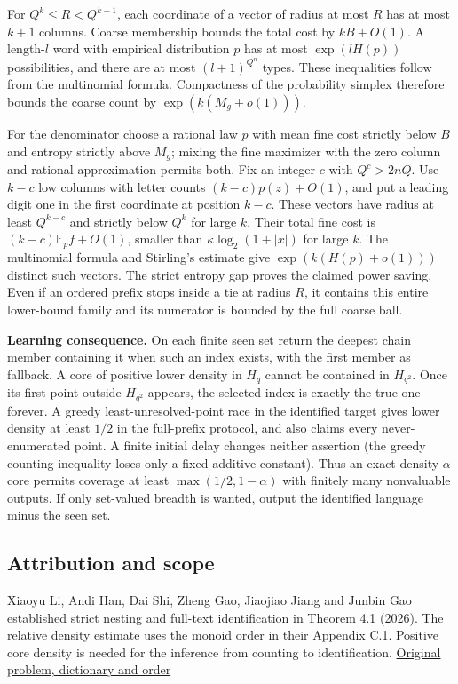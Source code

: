 \documentclass[11pt]{article}
\begin{document}
For \(Q^k\leq R<Q^{k+1}\), each coordinate of a vector of radius at most \(R\) has at most \(k+1\) columns. Coarse membership bounds the total cost by \(kB+O(1)\). A length-\(l\) word with empirical distribution \(p\) has at most \(\exp(lH(p))\) possibilities, and there are at most \((l+1)^{Q^n}\) types. These inequalities follow from the multinomial formula. Compactness of the probability simplex therefore bounds the coarse count by \(\exp(k(M_g+o(1)))\).

For the denominator choose a rational law \(p\) with mean fine cost strictly below \(B\) and entropy strictly above \(M_g\); mixing the fine maximizer with the zero column and rational approximation permits both. Fix an integer \(c\) with \(Q^c>2nQ\). Use \(k-c\) low columns with letter counts \((k-c)p(z)+O(1)\), and put a leading digit one in the first coordinate at position \(k-c\). These vectors have radius at least \(Q^{k-c}\) and strictly below \(Q^k\) for large \(k\). Their total fine cost is \((k-c)\mathbb E_p f+O(1)\), smaller than \(\kappa\log_2(1+|x|)\) for large \(k\). The multinomial formula and Stirling's estimate give \(\exp(k(H(p)+o(1)))\) distinct such vectors. The strict entropy gap proves the claimed power saving. Even if an ordered prefix stops inside a tie at radius \(R\), it contains this entire lower-bound family and its numerator is bounded by the full coarse ball.

\textbf{Learning consequence.} On each finite seen set return the deepest chain member containing it when such an index exists, with the first member as fallback. A core of positive lower density in \(H_q\) cannot be contained in \(H_{q^2}\). Once its first point outside \(H_{q^2}\) appears, the selected index is exactly the true one forever. A greedy least-unresolved-point race in the identified target gives lower density at least \(1/2\) in the full-prefix protocol, and also claims every never-enumerated point. A finite initial delay changes neither assertion (the greedy counting inequality loses only a fixed additive constant). Thus an exact-density-\(\alpha\) core permits coverage at least \(\max(1/2,1-\alpha)\) with finitely many nonvaluable outputs. If only set-valued breadth is wanted, output the identified language minus the seen set.

\subsection{Attribution and scope}\label{attribution-and-scope}

Xiaoyu Li, Andi Han, Dai Shi, Zheng Gao, Jiaojiao Jiang and Junbin Gao established strict nesting and full-text identification in Theorem 4.1 (2026). The relative density estimate uses the monoid order in their Appendix C.1. Positive core density is needed for the inference from counting to identification. \href{https://arxiv.org/abs/2606.14688v1}{Original problem, dictionary and order}
\end{document}
